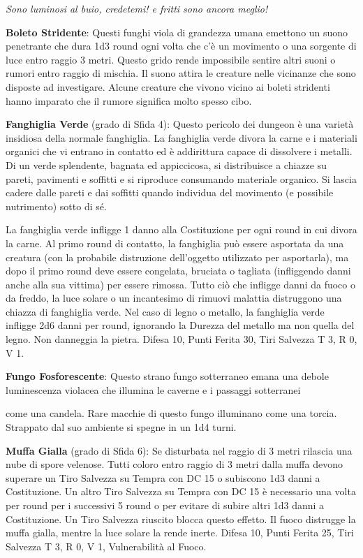 \begin{multicols}{2}
\begin{center}
	\emph{Sono luminosi al buio, credetemi! e fritti sono ancora meglio!}
\end{center}


\textbf{Boleto Stridente}: Questi funghi viola di grandezza umana emettono un suono penetrante che dura 1d3 round ogni volta che c'è un movimento o una sorgente di luce entro raggio 3 metri. Questo grido rende impossibile sentire altri suoni o rumori entro raggio di mischia. Il suono attira le creature nelle vicinanze che sono disposte ad investigare. Alcune creature che vivono vicino ai boleti stridenti hanno imparato che il rumore significa molto spesso cibo.

\textbf{Fanghiglia Verde} (grado di Sfida 4): Questo pericolo dei dungeon è una varietà insidiosa della normale fanghiglia.
La fanghiglia verde divora la carne e i materiali organici che vi entrano in contatto ed è addirittura capace di dissolvere i metalli. Di un verde splendente, bagnata ed appiccicosa, si distribuisce a chiazze su pareti, pavimenti e soffitti e si riproduce consumando materiale organico. Si lascia cadere dalle pareti e dai soffitti quando individua del movimento (e possibile nutrimento) sotto di sé.

La fanghiglia verde infligge 1 danno alla Costituzione per ogni round in cui divora la carne. Al primo round di contatto, la fanghiglia può essere asportata da una creatura (con la probabile distruzione dell'oggetto utilizzato per asportarla), ma dopo il primo round deve essere congelata, bruciata o tagliata (infliggendo danni anche alla sua vittima) per essere rimossa. Tutto ciò che infligge danni da fuoco o da freddo, la luce solare o un incantesimo di rimuovi malattia distruggono una chiazza di fanghiglia verde. Nel caso di legno o metallo, la fanghiglia verde infligge 2d6 danni per round, ignorando la Durezza del metallo ma non quella del legno. Non danneggia la pietra. Difesa 10, Punti Ferita 30, Tiri Salvezza T 3, R 0, V 1.

\textbf{Fungo Fosforescente}: Questo strano fungo sotterraneo emana una debole luminescenza violacea che illumina le caverne e i passaggi sotterranei

come una candela. Rare macchie di questo fungo illuminano come una torcia. Strappato dal suo ambiente si spegne in un 1d4 turni.

\textbf{Muffa Gialla} (grado di Sfida 6): Se disturbata nel raggio di 3 metri rilascia una nube di spore velenose. Tutti coloro entro raggio di 3 metri dalla muffa devono superare un Tiro Salvezza su Tempra con DC 15 o subiscono 1d3 danni a Costituzione. Un altro Tiro Salvezza su Tempra con DC 15 è necessario una volta per round per i successivi 5 round o per evitare di subire altri 1d3 danni a Costituzione. Un Tiro Salvezza riuscito blocca questo effetto. Il fuoco distrugge la muffa gialla, mentre la luce solare la rende inerte. Difesa 10, Punti Ferita 25, Tiri Salvezza T 3, R 0, V 1, Vulnerabilità al Fuoco.


\end{multicols}
